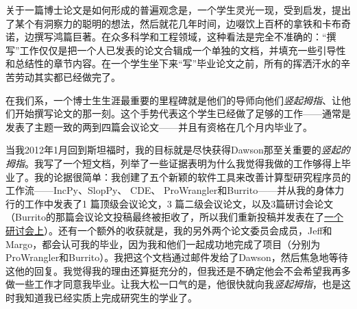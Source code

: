 \documentclass[12pt,UTF8,nofonts]{book}
\begin{document}
\breakline

关于一篇博士论文是如何形成的普遍观念是，一个学生灵光一现，受到启发，提出了某个有洞察力的聪明的想法，然后就花几年时间，边啜饮上百杯的拿铁和卡布奇诺，边撰写鸿篇巨著。在众多科学和工程领域，这种看法是完全不准确的：“撰写”工作仅仅是把一个人已发表的论文合辑成一个单独的文档，并填充一些引导性和总结性的章节内容。在一个学生坐下来“写”毕业论文之前，所有的挥洒汗水的辛苦劳动其实都已经做完了。

在我们系，一个博士生生涯最重要的里程碑就是他们的导师向他们\emph{竖起拇指}、让他们开始撰写论文的那一刻。这个手势代表这个学生已经做了足够的工作——通常是发表了主题一致的两到四篇会议论文——并且有资格在几个月内毕业了。

当我2012年1月回到斯坦福时，我的目标就是尽快获得Dawson那至关重要的\emph{竖起的拇指}。我写了一个短文档，列举了一些证据表明为什么我觉得我做的工作够得上毕业了。我的论据很简单：我创建了五个新颖的软件工具来改善计算型研究程序员的工作流——IncPy、SlopPy、 CDE、 ProWrangler和Burrito——并从我的身体力行的工作中发表了1 篇顶级会议论文，3 篇二级会议论文，以及3篇研讨会论文（Burrito的那篇会议论文投稿最终被拒收了，所以我们重新投稿并发表在了\href{http://www.pgbovine.net/projects/pubs/guo_burrito_tapp_2012.pdf}{一个研讨会上}）。还有一个额外的收获就是，我的另外两个论文委员会成员，Jeff和Margo，都会认可我的毕业，因为我和他们一起成功地完成了项目（分别为ProWrangler和Burrito）。我把这个文档通过邮件发给了Dawson，然后焦急地等待这他的回复。我觉得我的理由还算挺充分的，但我还是不确定他会不会希望我再多做一些工作才同意我毕业。让我大松一口气的是，他很快就向我\emph{竖起拇指}，也是这时我知道我已经实质上完成研究生的学业了。
\end{document}

